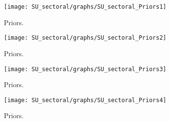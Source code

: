  
\begin{figure}[H]
\centering
\texttt{[image: SU\_sectoral/graphs/SU\_sectoral\_Priors1]}
\caption{Priors.}\label{Fig:Priors:1}
\end{figure}
\begin{figure}[H]
\centering
\texttt{[image: SU\_sectoral/graphs/SU\_sectoral\_Priors2]}
\caption{Priors.}\label{Fig:Priors:2}
\end{figure}
\begin{figure}[H]
\centering
\texttt{[image: SU\_sectoral/graphs/SU\_sectoral\_Priors3]}
\caption{Priors.}\label{Fig:Priors:3}
\end{figure}
\begin{figure}[H]
\centering
\texttt{[image: SU\_sectoral/graphs/SU\_sectoral\_Priors4]}
\caption{Priors.}\label{Fig:Priors:4}
\end{figure}
 
